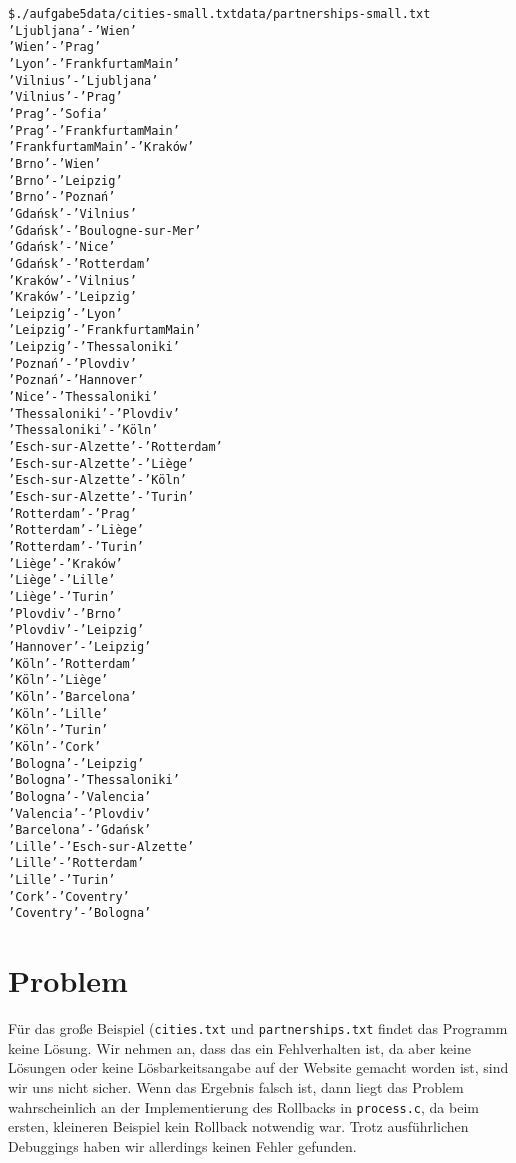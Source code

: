 \documentclass{scrartcl}
\begin{document}
\begin{alltt}
\$ ./aufgabe5 data/cities-small.txt data/partnerships-small.txt
'Ljubljana' - 'Wien'
'Wien' - 'Prag'
'Lyon' - 'Frankfurt am Main'
'Vilnius' - 'Ljubljana'
'Vilnius' - 'Prag'
'Prag' - 'Sofia'
'Prag' - 'Frankfurt am Main'
'Frankfurt am Main' - 'Kraków'
'Brno' - 'Wien'
'Brno' - 'Leipzig'
'Brno' - 'Poznań'
'Gdańsk' - 'Vilnius'
'Gdańsk' - 'Boulogne-sur-Mer'
'Gdańsk' - 'Nice'
'Gdańsk' - 'Rotterdam'
'Kraków' - 'Vilnius'
'Kraków' - 'Leipzig'
'Leipzig' - 'Lyon'
'Leipzig' - 'Frankfurt am Main'
'Leipzig' - 'Thessaloniki'
'Poznań' - 'Plovdiv'
'Poznań' - 'Hannover'
'Nice' - 'Thessaloniki'
'Thessaloniki' - 'Plovdiv'
'Thessaloniki' - 'Köln'
'Esch-sur-Alzette' - 'Rotterdam'
'Esch-sur-Alzette' - 'Liège'
'Esch-sur-Alzette' - 'Köln'
'Esch-sur-Alzette' - 'Turin'
'Rotterdam' - 'Prag'
'Rotterdam' - 'Liège'
'Rotterdam' - 'Turin'
'Liège' - 'Kraków'
'Liège' - 'Lille'
'Liège' - 'Turin'
'Plovdiv' - 'Brno'
'Plovdiv' - 'Leipzig'
'Hannover' - 'Leipzig'
'Köln' - 'Rotterdam'
'Köln' - 'Liège'
'Köln' - 'Barcelona'
'Köln' - 'Lille'
'Köln' - 'Turin'
'Köln' - 'Cork'
'Bologna' - 'Leipzig'
'Bologna' - 'Thessaloniki'
'Bologna' - 'Valencia'
'Valencia' - 'Plovdiv'
'Barcelona' - 'Gdańsk'
'Lille' - 'Esch-sur-Alzette'
'Lille' - 'Rotterdam'
'Lille' - 'Turin'
'Cork' - 'Coventry'
'Coventry' - 'Bologna'
\end{alltt}

\section{Problem}

Für das große Beispiel (\texttt{cities.txt} und \texttt{partnerships.txt} findet das Programm keine Lösung. Wir nehmen an, dass das ein Fehlverhalten ist, da aber keine Lösungen oder keine Lösbarkeitsangabe auf der Website gemacht worden ist, sind wir uns nicht sicher. Wenn das Ergebnis falsch ist, dann liegt das Problem wahrscheinlich an der Implementierung des Rollbacks in \texttt{process.c}, da beim ersten, kleineren Beispiel kein Rollback notwendig war. Trotz ausführlichen Debuggings haben wir allerdings keinen Fehler gefunden.
\end{document}
